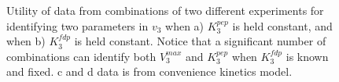 \documentclass[10pt]{article}
\begin{document}
\begin{figure}[!tbhp]
	\caption{Utility of data from combinations of two different experiments for identifying two parameters in $v_3$ when a) $K_3^{pep}$ is held constant, and when b) $K_3^{fdp}$ is held constant. Notice that a significant number of combinations can identify both $V_3^{max}$ and $K_3^{pep}$ when $K_3^{fdp}$ is known and fixed. c and d data is from convenience kinetics model.}%
\end{figure}		
\end{document}
